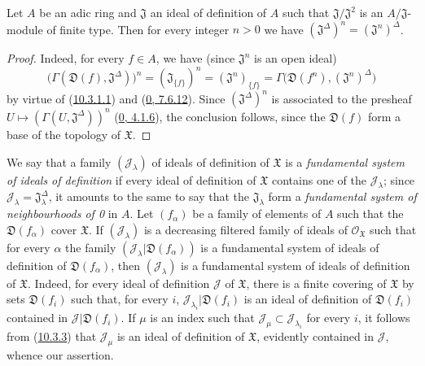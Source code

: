 \begin{proposition}[10.3.6]
\label{I.10.3.6}
Let $A$ be an adic ring and $\mathfrak{J}$ an ideal of definition of $A$
such that $\mathfrak{J}/\mathfrak{J}^2$ is an
$A/\mathfrak{J}$-module of finite type. Then for every integer $n>0$ we
have $(\mathfrak{J}^\Delta)^n=(\mathfrak{J}^n)^\Delta$.
\end{proposition}

\begin{proof}
Indeed, for every $f\in A$, we have (since $\mathfrak{J}^n$ is an open
ideal)
\[
  \bigl(\Gamma(\mathfrak{D}(f),\mathfrak{J}^\Delta)\bigr)^n
  =(\mathfrak{J}_{\{f\}})^n
  =(\mathfrak{J}^n)_{\{f\}}
  =\Gamma\bigl(\mathfrak{D}(f^n),(\mathfrak{J}^n)^\Delta\bigr)
\]
by virtue of (\hyperref[I.10.3.1.1]{10.3.1.1}) and
(\hyperref[0.7.6.12]{0, 7.6.12}). Since
$(\mathfrak{J}^\Delta)^n$ is associated to the presheaf
$U\mapsto(\Gamma(U,\mathfrak{J}^\Delta))^n$
(\hyperref[0.4.1.6]{0, 4.1.6}), the conclusion follows, since the
$\mathfrak{D}(f)$ form a base of the topology of $\mathfrak{X}$.
\end{proof}

\begin{env}[10.3.7]
\label{I.10.3.7}
We say that a family $(\mathscr{J}_\lambda)$ of ideals of definition of
$\mathfrak{X}$ is a \emph{fundamental system of ideals of definition}
if every ideal of definition of $\mathfrak{X}$ contains one of the
$\mathscr{J}_\lambda$; since
$\mathscr{J}_\lambda=\mathfrak{J}_\lambda^\Delta$, it amounts to the same to
say that the $\mathfrak{J}_\lambda$ form a \emph{fundamental system
of neighbourhoods of 0} in $A$. Let $(f_\alpha)$ be a family of elements of
$A$ such that the $\mathfrak{D}(f_\alpha)$ cover $\mathfrak{X}$. If
$(\mathscr{J}_\lambda)$ is a decreasing filtered family of ideals of
$\mathscr{O}_{\mathfrak{X}}$ such that for every $\alpha$ the family
$(\mathscr{J}_\lambda|\mathfrak{D}(f_\alpha))$ is a fundamental system
of ideals of definition of $\mathfrak{D}(f_\alpha)$, then
$(\mathscr{J}_\lambda)$ is a fundamental system of ideals of definition
of $\mathfrak{X}$. Indeed, for every ideal of definition $\mathscr{J}$
of $\mathfrak{X}$, there is a finite covering of $\mathfrak{X}$ by sets
$\mathfrak{D}(f_i)$ such that, for every $i$,
$\mathscr{J}_{\lambda_i}|\mathfrak{D}(f_i)$ is an ideal of definition
of $\mathfrak{D}(f_i)$ contained in
$\mathscr{J}|\mathfrak{D}(f_i)$. If $\mu$ is an index such that
$\mathscr{J}_\mu\subset\mathscr{J}_{\lambda_i}$ for every $i$, it follows
from (\hyperref[I.10.3.3]{10.3.3}) that $\mathscr{J}_\mu$ is an ideal of
definition of $\mathfrak{X}$, evidently contained in $\mathscr{J}$, whence
our assertion.
\end{env}

